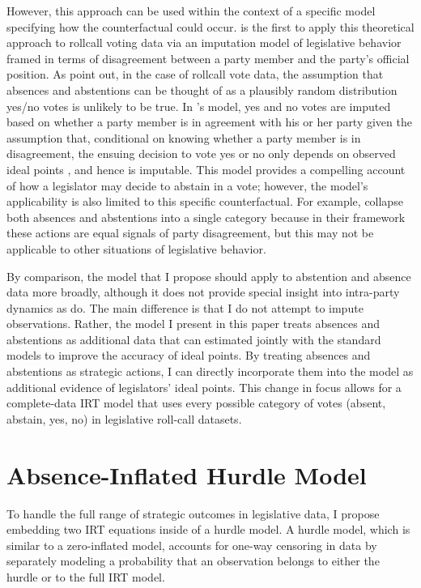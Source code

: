 	However, this approach can be used within the context of a specific model specifying how the counterfactual could occur. \textcite{rosas2015} is the first to apply this theoretical approach to rollcall voting data via an imputation model of legislative behavior framed in terms of disagreement between a party member and the party's official position.  As \textcite{rosas2015} point out, in the case of rollcall vote data, the assumption that absences and abstentions can be thought of as a plausibly random distribution yes/no votes is unlikely to be true. In \citeauthor{rosas2015}'s model, yes and no votes are imputed based on whether a party member is in agreement with his or her party given the assumption that, conditional on knowing whether a party member is in disagreement, the ensuing decision to vote yes or no only depends on observed ideal points \parencite{rubin2002}, and hence is imputable. This model provides a compelling account of how a legislator may decide to abstain in a vote; however, the model's applicability is also limited to this specific counterfactual. For example, \citeauthor{rosas2015} collapse both absences and abstentions into a single category because in their framework these actions are equal signals of party disagreement, but this may not be applicable to other situations of legislative behavior.
	
	By comparison, the model that I propose should apply to abstention and absence data more broadly, although it does not provide special insight into intra-party dynamics as \textcite{rosas2015} do. The main difference is that I do not attempt to impute observations. Rather, the model I present in this paper treats absences and abstentions as additional data that can estimated jointly with the standard models to improve the accuracy of ideal points. By treating absences and abstentions as strategic actions, I can directly incorporate them into the model as additional evidence of legislators' ideal points. This change in focus allows for a complete-data IRT model that uses every possible category of votes (absent, abstain, yes, no) in legislative roll-call datasets.
	
	
	
	\section*{Absence-Inflated Hurdle Model}
	
	To handle the full range of strategic outcomes in legislative data, I propose embedding two IRT equations inside of a hurdle model. A hurdle model, which is similar to a zero-inflated model, accounts for one-way censoring in data by separately modeling a probability that an observation belongs to either the hurdle or to the full IRT model. 
	
